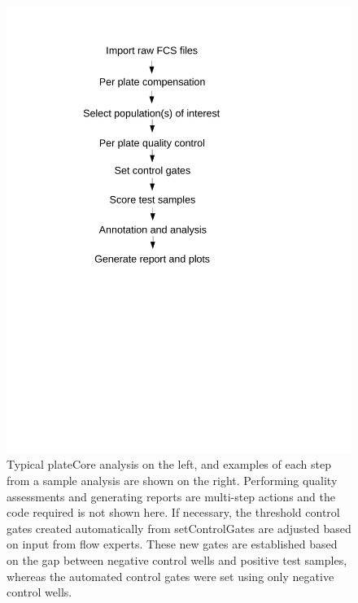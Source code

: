 \documentclass[12pt]{article}
\begin{document}
\begin{figure}
\centering
\includegraphics{analysisSteps.pdf}
\caption{Typical plateCore analysis on the left, and examples of each step from a sample analysis are shown on the right.
Performing quality assessments and generating reports are multi-step actions and the code required is not shown here.
If necessary, the threshold control gates created automatically from setControlGates are adjusted based on input from flow experts. 
These new gates are established based on the gap between negative control wells and positive test samples, whereas the automated
control gates were set using only negative control wells.}
\label{fig:analysis}
\end{figure}
 
\clearpage
\end{document}
